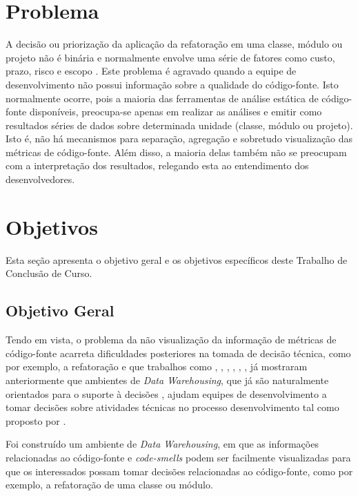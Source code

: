\section{Problema}

A decisão ou priorização da aplicação da refatoração em uma classe, módulo ou projeto não é binária e normalmente envolve uma série de fatores como custo, prazo, risco e escopo \cite{yamashita2013assessing}. Este problema é agravado quando a equipe de desenvolvimento não possui informação sobre a qualidade do código-fonte. Isto normalmente ocorre, pois a maioria das ferramentas de análise estática de código-fonte disponíveis, preocupa-se apenas em realizar as análises e emitir como resultados séries de dados sobre determinada unidade (classe, módulo ou projeto). Isto é, não há mecanismos para separação, agregação e sobretudo visualização das métricas de código-fonte. Além disso, a maioria delas também não se preocupam com a interpretação dos resultados, relegando esta ao entendimento dos desenvolvedores.



\section{Objetivos}

Esta seção apresenta o objetivo geral e os objetivos específicos deste Trabalho de Conclusão de Curso.

\subsection{Objetivo Geral}

	  Tendo em vista, o problema da não visualização da informação de métricas de código-fonte acarreta dificuldades posteriores na tomada de decisão técnica, como por exemplo, a refatoração e que trabalhos como , , , , , , já mostraram anteriormente que ambientes de \textit{Data Warehousing}, que já são naturalmente orientados para o suporte à decisões , ajudam equipes de desenvolvimento a tomar decisões sobre atividades técnicas no processo desenvolvimento tal como proposto por .  

	  Foi construído um ambiente de \textit{Data Warehousing}, em que as informações relacionadas ao código-fonte e \textit{code-smells} podem ser facilmente visualizadas para que os interessados possam tomar decisões relacionadas ao código-fonte, como por exemplo, a refatoração de uma classe ou módulo.

